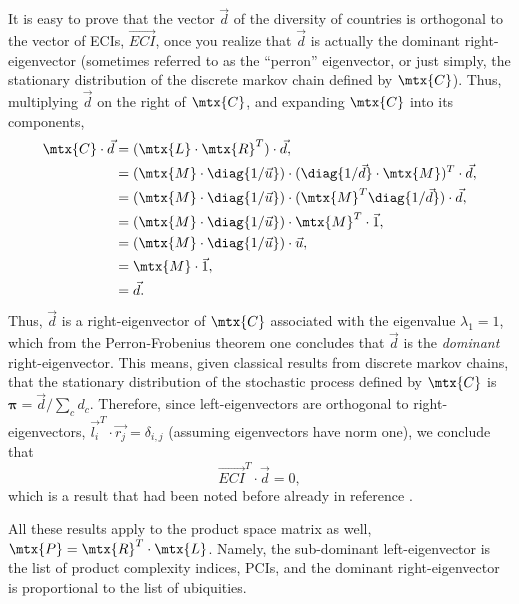 \documentclass[9pt,twocolumn,twoside,lineno]{pnas-new}
\begin{document}
It is easy to prove that the vector $\vec{d}$ of the diversity of countries is orthogonal to the vector of ECIs, $\vec{ECI}$, once you realize that $\vec{d}$ is actually the dominant right-eigenvector (sometimes referred to as the ``perron'' eigenvector, or just simply, the stationary distribution of the discrete markov chain defined by $\mtx{C}$). Thus, multiplying $\vec{d}$ on the right of $\mtx{C}$, and expanding $\mtx{C}$ into its components,
\begin{align}
    \mtx{C}\cdot\vec{d} &= (\mtx{L}\cdot\mtx{R}^T)\cdot\vec{d}, \nonumber \\
    &= (\mtx{M}\cdot\diag{1/\vec{u}})\cdot(\diag{1/\vec{d}}\cdot\mtx{M})^T\cdot\vec{d}, \nonumber \\
    &= (\mtx{M}\cdot\diag{1/\vec{u}})\cdot(\mtx{M}^T\diag{1/\vec{d}})\cdot\vec{d}, \nonumber \\
    &= (\mtx{M}\cdot\diag{1/\vec{u}})\cdot\mtx{M}^T\cdot\vec{1}, \nonumber \\
    &= (\mtx{M}\cdot\diag{1/\vec{u}})\cdot\vec{u}, \nonumber \\
    &= \mtx{M}\cdot\vec{1}, \nonumber \\
    &= \vec{d}.
\end{align}
Thus, $\vec{d}$ is a right-eigenvector of $\mtx{C}$ associated with the eigenvalue $\lambda_1=1$, which from the Perron-Frobenius theorem one concludes that $\vec{d}$ is the \emph{dominant} right-eigenvector. This means, given classical results from discrete markov chains, that the stationary distribution of the stochastic process defined by $\mtx{C}$ is ${\boldsymbol \pi} = \vec{d}/\sum_c d_c$. Therefore, since left-eigenvectors are orthogonal to right-eigenvectors, $\vec{l_i}^T \cdot \vec{r_j}=\delta_{i,j}$ (assuming eigenvectors have norm one), we conclude that $$\vec{ECI}^T\cdot\vec{d}=0,$$ which is a result that had been noted before already in reference \cite{eric2014}.

All these results apply to the product space matrix as well, $\mtx{P} = \mtx{R}^T\cdot \mtx{L}$. Namely, the sub-dominant left-eigenvector is the list of product complexity indices, PCIs, and the dominant right-eigenvector is proportional to the list of ubiquities.
\end{document}
